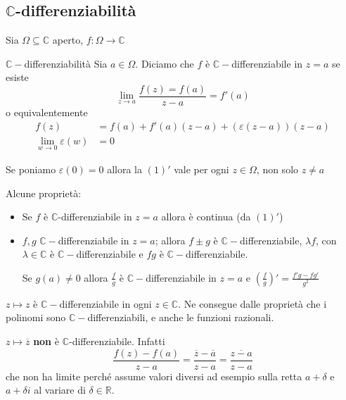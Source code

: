 \subsection{\(\mathbb{C}\)-differenziabilità}
Sia \(\Omega \subseteq \mathbb{C}\) aperto, \(f : \Omega \to \mathbb{C}\) 
\begin{definition}{\(\mathbb{C}-\)differenziabilità}
    Sia \(a \in \Omega\). Diciamo che \(f\)  è \(\mathbb{C}-\)differenziabile in
    \(z=a\) se esiste
    \begin{equation}
        \lim_{z \to a} \frac{f(z) = f(a)}{z - a} = f'(a)
    \end{equation}
    o equivalentemente
    \begin{align}
        f(z) &= f(a) + f'(a) (z-a) + (\varepsilon(z-a))(z-a) \\
        \lim_{w \to 0} \varepsilon(w) &= 0
    \end{align}
\end{definition}
Se poniamo \(\varepsilon(0) = 0\) allora la \((1)'\) vale per ogni \(z \in
\Omega\), non solo \(z\neq a\) 

Alcune proprietà:
\begin{itemize}[label = --]
    \item Se \(f\) è \(\mathbb{C}\)-differenziabile in \(z = a\) allora è
        continua (da \((1)'\))
    \item \(f, g\) \(\mathbb{C}-\)differenziabile in \(z=a\); allora \(f \pm g\)
        è \(\mathbb{C}-\)differenziabile, \(\lambda f\), con \(\lambda \in
        \mathbb{C}\) è \(\mathbb{C}-\)differenziabile e \(fg\) è
        \(\mathbb{C}-\)differenziabile.

        Se \(g(a) \neq 0\) allora \(\frac{f}{g}\) è
        \(\mathbb{C}-\)differenziabile in \(z=a\) e \({\left( \frac{f}{g}
        \right)}' = \frac{f'g -
        fg'}{g^2}\) 
\end{itemize}
\begin{example}
    \(z \mapsto z\) è \(\mathbb{C}-\)differenziabile in ogni \(z \in
    \mathbb{C}\). Ne consegue dalle proprietà che i polinomi sono
    \(\mathbb{C}-\)differenziabili, e anche le funzioni razionali.
\end{example}
\begin{example}
    \(z \mapsto \overline{z}\) \textbf{non} è \(\mathbb{C}\)-differenziabile.
    Infatti
    \[
        \frac{f(z) - f(a)}{z-a} = \frac{\overline{z} - \overline{a} }{z-a} =
        \frac{\overline{z-a}}{z-a}
    \]
    che non ha limite perché assume valori diversi ad esempio sulla retta \(a +
    \delta \) e \(a + \delta i\) al variare di \(\delta \in \mathbb{R}\).
\end{example}

